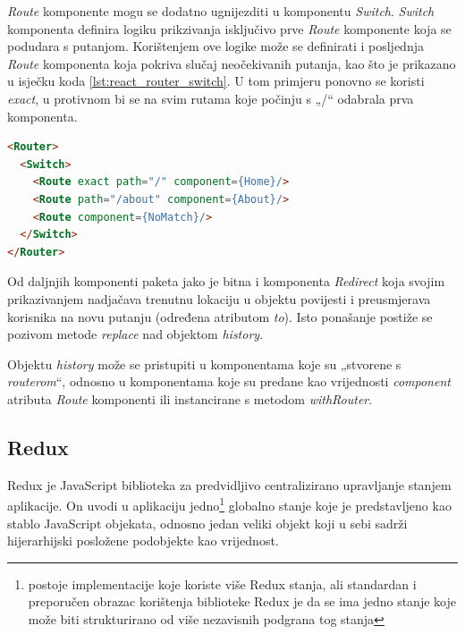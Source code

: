 \documentclass[times, utf8, diplomski, numeric]{fer}
\newcommand{\razmakp}{\vspace{18pt}}
\newcommand{\razmaks}{\vspace{10pt}}
\begin{document}
\emph{Route} komponente mogu se dodatno ugnijezditi u komponentu \emph{Switch}.
\emph{Switch} komponenta definira logiku prikzivanja isključivo prve \emph{Route} komponente koja se podudara s putanjom.
Korištenjem ove logike može se definirati i posljednja \emph{Route} komponenta koja pokriva slučaj neočekivanih putanja, kao što je prikazano u isječku koda \ref{lst:react_router_switch}.
U tom primjeru ponovno se koristi \emph{exact}, u protivnom bi se na svim rutama koje počinju s „/“ odabrala prva komponenta.

\razmakp %
\begin{lstlisting}[language=html, caption={Primjer korištenja \emph{Switch}komponente}, label={lst:react_router_switch}]
<Router>
  <Switch>
    <Route exact path="/" component={Home}/>
    <Route path="/about" component={About}/>
    <Route component={NoMatch}/>
  </Switch>
</Router>
\end{lstlisting}
\razmaks

Od daljnjih komponenti paketa jako je bitna i komponenta \emph{Redirect} koja svojim prikazivanjem nadjačava trenutnu lokaciju u objektu povijesti i preusmjerava korisnika na novu putanju (određena atributom \emph{to}).
Isto ponašanje postiže se pozivom metode \emph{replace} nad objektom \emph{history}.

Objektu \emph{history} može se pristupiti u komponentama koje su „stvorene s \emph{routerom}“, odnosno u komponentama koje su predane kao vrijednosti \emph{component} atributa \emph{Route} komponenti ili instancirane s metodom \emph{withRouter}.


\subsection{Redux}

Redux je JavaScript biblioteka za predvidljivo centralizirano upravljanje stanjem aplikacije.
On uvodi u aplikaciju jedno\footnote{
    postoje implementacije koje koriste više Redux stanja, ali standardan i preporučen obrazac korištenja biblioteke Redux je da se ima jedno stanje koje može biti strukturirano od više nezavisnih podgrana tog stanja
} globalno stanje koje je predstavljeno kao stablo JavaScript objekata, odnosno jedan veliki objekt koji u sebi sadrži hijerarhijski posložene podobjekte kao vrijednost.
\end{document}
